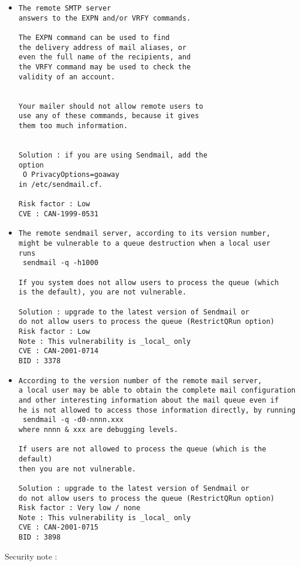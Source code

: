 \documentclass{article}
\begin{document}
\begin{itemize}
\item \begin{verbatim}
The remote SMTP server
answers to the EXPN and/or VRFY commands.

The EXPN command can be used to find 
the delivery address of mail aliases, or 
even the full name of the recipients, and 
the VRFY command may be used to check the 
validity of an account.


Your mailer should not allow remote users to
use any of these commands, because it gives
them too much information.


Solution : if you are using Sendmail, add the 
option
 O PrivacyOptions=goaway
in /etc/sendmail.cf.

Risk factor : Low
CVE : CAN-1999-0531
\end{verbatim}\item \begin{verbatim}
The remote sendmail server, according to its version number,
might be vulnerable to a queue destruction when a local user
runs
 sendmail -q -h1000

If you system does not allow users to process the queue (which
is the default), you are not vulnerable.

Solution : upgrade to the latest version of Sendmail or 
do not allow users to process the queue (RestrictQRun option)
Risk factor : Low
Note : This vulnerability is _local_ only
CVE : CAN-2001-0714
BID : 3378
\end{verbatim}\item \begin{verbatim}
According to the version number of the remote mail server, 
a local user may be able to obtain the complete mail configuration
and other interesting information about the mail queue even if
he is not allowed to access those information directly, by running
 sendmail -q -d0-nnnn.xxx
where nnnn & xxx are debugging levels.

If users are not allowed to process the queue (which is the default)
then you are not vulnerable.

Solution : upgrade to the latest version of Sendmail or 
do not allow users to process the queue (RestrictQRun option)
Risk factor : Very low / none
Note : This vulnerability is _local_ only
CVE : CAN-2001-0715
BID : 3898
\end{verbatim}\end{itemize}
Security note :\\
\end{document}
